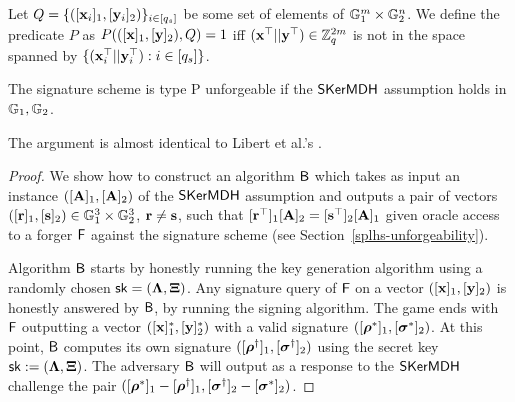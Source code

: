 Let $Q=\{ ([\mathbf{x}_i]_1,[\mathbf{y}_i]_2) \}_{i \in [q_s]}$ be some set of elements of $\mathbb{G}_1^{m} \times \mathbb{G}_2^n$. We define the predicate $P$ as $P(([\mathbf{x}]_1,[\mathbf{y}]_2),Q)=1$ iff $(\mathbf{x}^{\top}||\mathbf{y}^{\top}) \in \mathbb{Z}_q^{2m}$ is not in the space spanned by $\{(\mathbf{x}_i^{\top}||\mathbf{y}_i^{\top}) :i \in [q_s]\}$. 

\begin{theorem} The signature scheme is type P unforgeable if the $\mathsf{SKerMDH}$ assumption holds in $\mathbb{G}_1,\mathbb{G}_2$.
\end{theorem}
The argument is almost identical to Libert et al.'s \cite{C:LPJY13}.
\begin{proof} We show how to construct an algorithm $\mathsf{B}$ which takes as input an instance $([\mathbf{{A}}]_1,[\mathbf{{A}}]_2)$ of the $\mathsf{SKerMDH}$ assumption and outputs a pair of vectors $([\mathbf{r}]_1,[\mathbf{s}]_2) \in \mathbb{G}_1^{3} \times \mathbb{G}_2^{3}$, $\mathbf{r} \neq \mathbf{s}$, such that 
$[\mathbf{r}^{\top}]_1 [\mathbf{{A}}]_2=[\mathbf{s}^{\top}]_2 [\mathbf{{A}}]_1$ given oracle access to a forger $\mathsf{F}$ against the signature scheme
(see Section~\ref{splhs-unforgeability}). 

Algorithm $\mathsf{B}$ starts by honestly running the key generation algorithm 
using a randomly chosen $\mathsf{sk}=(\mathbf{{\Lambda}},\mathbf{{\Xi}})$. Any signature query of $\mathsf{F}$ on a vector
$([\mathbf{x}]_1,[\mathbf{y}]_2)$ is honestly answered by $\mathsf{B}$, by running the signing algorithm.
The game ends with $\mathsf{F}$ outputting a vector $([\mathbf{x}]_1^*,[\mathbf{y}]_2^*)$ 
with a valid signature $([{\boldsymbol \rho}^{*}]_1, [{\boldsymbol \sigma}^{*}]_2)$. At this point, $\mathsf{B}$ computes its own signature $([{\boldsymbol \rho}^{\dagger}]_1, [{\boldsymbol \sigma}^{\dagger}]_2)$ using the secret key $\mathsf{sk}:=(\mathbf{{\Lambda}},\mathbf{{\Xi}})$. The adversary $\mathsf{B}$ will output as a response to the $\mathsf{SKerMDH}$ challenge the pair $([{\boldsymbol \rho}^{*}]_1-[{\boldsymbol \rho}^{\dagger}]_1,[ {\boldsymbol \sigma}^{\dagger}]_2-[{\boldsymbol \sigma}^{*}]_2)$.


\end{proof}
